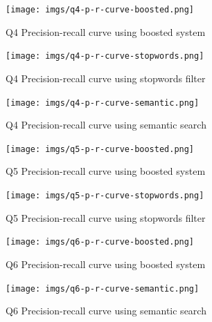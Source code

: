 \documentclass[sigconf]{acmart}
\begin{document}
\begin{figure}[H]
  \centering
  \texttt{[image: imgs/q4-p-r-curve-boosted.png]}
  \caption{Q4 Precision-recall curve using boosted system}
  \label{fig:q4_boosted}
\end{figure}

\begin{figure}[H]
  \centering
  \texttt{[image: imgs/q4-p-r-curve-stopwords.png]}
  \caption{Q4 Precision-recall curve using stopwords filter}
  \label{fig:q4_stopwords}
\end{figure}

\begin{figure}[H]
  \centering
  \texttt{[image: imgs/q4-p-r-curve-semantic.png]}
  \caption{Q4 Precision-recall curve using  semantic search}
  \label{fig:q4_semantic}
\end{figure}


\begin{figure}[H]
  \centering
  \texttt{[image: imgs/q5-p-r-curve-boosted.png]}
  \caption{Q5 Precision-recall curve using boosted system}
  \label{fig:q5_boosted}
\end{figure}

\begin{figure}[H]
  \centering
  \texttt{[image: imgs/q5-p-r-curve-stopwords.png]}
  \caption{Q5 Precision-recall curve using stopwords filter}
  \label{fig:q5_stopwords}
\end{figure}

\begin{figure}[H]
  \centering
  \texttt{[image: imgs/q6-p-r-curve-boosted.png]}
  \caption{Q6 Precision-recall curve using boosted system}
  \label{fig:q6_boosted}
\end{figure}

\begin{figure}[H]
  \centering
  \texttt{[image: imgs/q6-p-r-curve-semantic.png]}
  \caption{Q6 Precision-recall curve using  semantic search}
  \label{fig:q6_semantic}
\end{figure}
\end{document}
